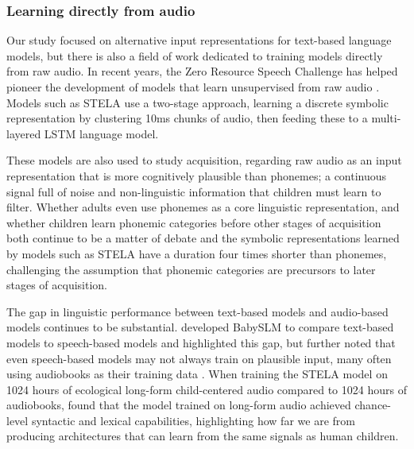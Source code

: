 \subsubsection{Learning directly from audio}
\label{sec:audiomodels}

Our study focused on alternative input representations for text-based language models, but there is also a field of work dedicated to training models directly from raw audio.
In recent years, the Zero Resource Speech Challenge has helped pioneer the development of models that learn unsupervised from raw audio \citep{dunbar_self-supervised_2022}. Models such as STELA \citep{schatz2021early, lavechin2022can} use a two-stage approach, learning a discrete symbolic representation by clustering 10ms chunks of audio, then feeding these to a multi-layered LSTM language model.

These models are also used to study acquisition, regarding raw audio as an input representation that is more cognitively plausible than phonemes; a continuous signal full of noise and non-linguistic information that children must learn to filter. Whether adults even use phonemes as a core linguistic representation, and whether children learn phonemic categories before other stages of acquisition both continue to be a matter of debate \citep{kazanina2018phonemes, matusevych2023infant} and the symbolic representations learned by models such as STELA have a duration four times shorter than phonemes, challenging the assumption that phonemic categories are precursors to later stages of acquisition. 

The gap in linguistic performance between text-based models and audio-based models continues to be substantial. \citet{lavechin} developed BabySLM to compare text-based models to speech-based models and highlighted this gap, but further noted that even speech-based models may not always train on plausible input, many often using audiobooks as their training data \citep{kahn2020libri}. When training the STELA model on 1024 hours of ecological long-form child-centered audio compared to 1024 hours of audiobooks, \citet{lavechin} found that the model trained on long-form audio achieved chance-level syntactic and lexical capabilities, highlighting how far we are from producing architectures that can learn from the same signals as human children.


